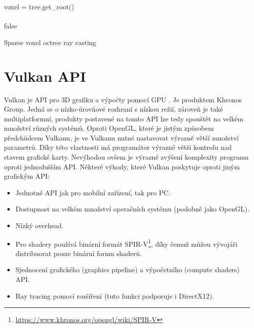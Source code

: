 \begin{center}
	\begin{czechalgorithm}[H] \label{alg:svo}
		voxel = tree.get\_root()\\
		\\
		\KwRet false
		\caption{Sparse voxel octree ray casting}
	\end{czechalgorithm}
\end{center}

\section{Vulkan API}
Vulkan je API pro 3D grafiku a výpočty pomocí GPU \cite{vulkan_web}. Je produktem Khronos Group. Jedná se o nízko-úrovňové rozhraní s nízkou režií, zároveň je také multiplatformní, produkty postavené na tomto API lze tedy spouštět na velkém množství různých systémů. Oproti OpenGL, které je jistým způsobem předchůdcem Vulkanu, je ve Vulkanu nutné nastavovat výrazně větší množství parametrů. Díky této vlastnosti má programátor výrazně větší kontrolu nad stavem grafické karty. Nevýhodou ovšem je výrazné zvýšení komplexity programu oproti jednodušším API. Některé výhody, které Vulkan poskytuje oproti jiným grafickým API:

\begin{itemize}
	\item Jednotné API jak pro mobilní zařízení, tak pro PC.
	\item Dostupnost na velkém množství operačních systému (podobně jako OpenGL).
	\item Nízký overhead.
	\item Pro shadery používá binární formát SPIR-V\footnote{\url{https://www.khronos.org/opengl/wiki/SPIR-V}}, díky čemuž můžou vývojáři distribuovat pouze binární formu shaderů.
	\item Sjednocení grafického (graphics pipeline) a výpočetního (compute shaders) API.
	\item Ray tracing pomocí rozšíření (tuto funkci podporuje i DirectX12).
\end{itemize}

